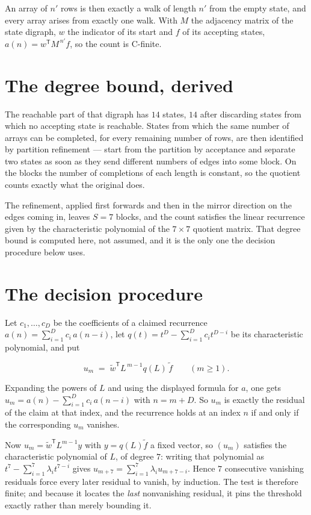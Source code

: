 \documentclass[11pt]{article}
\theoremstyle{definition}
\begin{document}
An array of $n'$ rows is then exactly a walk of length $n'$ from the empty state, and every array arises from exactly one walk. With $M$ the adjacency matrix of the state digraph, $w$ the indicator of its start and $f$ of its accepting states, $a(n) = w^{\mathsf T}M^{\,n'}f$, so the count is C-finite.

\section{The degree bound, derived}

The reachable part of that digraph has $14$ states, $14$ after discarding states from which no accepting state is reachable. States from which the same number of arrays can be completed, for every remaining number of rows, are then identified by partition refinement --- start from the partition by acceptance and separate two states as soon as they send different numbers of edges into some block. On the blocks the number of completions of each length is constant, so the quotient counts exactly what the original does.

The refinement, applied first forwards and then in the mirror direction on the edges coming in, leaves $S = 7$ blocks, and the count satisfies the linear recurrence given by the characteristic polynomial of the $7 \times 7$ quotient matrix. That degree bound is computed here, not assumed, and it is the only one the decision procedure below uses.

\section{The decision procedure}

Let $c_1,\dots,c_D$ be the coefficients of a claimed recurrence $a(n) = \sum_{i=1}^{D} c_i\,a(n-i)$, let $q(t) = t^{D} - \sum_{i=1}^{D} c_i t^{D-i}$ be its characteristic polynomial, and put

\[u_m \;=\; \tilde w^{\mathsf T} L^{\,m-1} q(L)\,\tilde f \qquad (m \ge 1).\]

Expanding the powers of $L$ and using the displayed formula for $a$, one gets $u_m = a(n) - \sum_{i=1}^{D} c_i\,a(n-i)$ with $n = m + D$. So $u_m$ is exactly the residual of the claim at that index, and the recurrence holds at an index $n$ if and only if the corresponding $u_m$ vanishes.

Now $u_m = \tilde w^{\mathsf T} L^{m-1} y$ with $y = q(L)\tilde f$ a fixed vector, so $(u_m)$ satisfies the characteristic polynomial of $L$, of degree $7$: writing that polynomial as $t^{7} - \sum_{i=1}^{7} \lambda_i t^{7-i}$ gives $u_{m+7} = \sum_{i=1}^{7} \lambda_i u_{m+7-i}$. Hence $7$ consecutive vanishing residuals force every later residual to vanish, by induction. The test is therefore finite; and because it locates the {\itshape last} nonvanishing residual, it pins the threshold exactly rather than merely bounding it.
\end{document}
